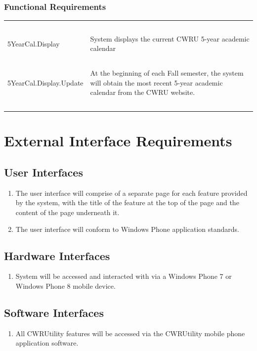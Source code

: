 \documentclass[pdftex,12pt,letter]{article}
\begin{document}
\subsubsection{Functional Requirements}
\begin{table}[!h]
\begin{tabularx}{\textwidth}[t]{|l Y|}
\hline
~&~\\
5YearCal.Display & System displays the current CWRU 5-year academic calendar\\ 
~&~\\
5YearCal.Display.Update & At the beginning of each Fall semester, the system will obtain the most recent 5-year academic calendar from the CWRU website.\\
~&~\\
\hline
\end{tabularx}
\end{table}
\FloatBarrier
\section{External Interface Requirements}
\subsection{User Interfaces}
\begin{enumerate}[UI-1:]
\item The user interface will comprise of a separate page for each feature provided by the system, with the title of the feature at the top of the page and the content of the page underneath it.
\item The user interface will conform to Windows Phone application standards.
\end{enumerate}
\subsection{Hardware Interfaces}
\begin{enumerate}[HI-1:]
\item System will be accessed and interacted with via a Windows Phone 7 or Windows Phone 8 mobile device.
\end{enumerate}
\subsection{Software Interfaces}
\begin{enumerate}
\item All CWRUtility features will be accessed via the CWRUtility mobile phone application software.
\end{enumerate}
\end{document}
